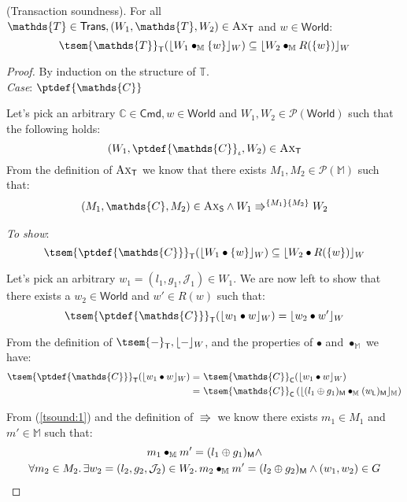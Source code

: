 \begin{thm}
	\label{thm:soundTrans}
	(Transaction soundness).
	For all $\mathds{T} \in \mathsf{Trans}, (W_1, \mathds{T}, W_2) \in \textsc{Ax}_\mathsf{T}$ and $w \in \mathsf{World}$:
	\[
		\tsem{\mathds{T}}_\mathsf{T}(\lfloor W_1 \bullet_\mathbb{M} \{ w \} \rfloor_W) \subseteq \lfloor W_2 \bullet_\mathbb{M} R(\{ w \}) \rfloor_W
	\]
	
	{\parindent0pt
	\begin{proof}
	By induction on the structure of $\mathds{T}$. \\	
	
	\textit{Case}: $\ptdef{\mathds{C}}$
	
	Let's pick an arbitrary $\mathds{C} \in \mathsf{Cmd}, w \in \mathsf{World}$ and $W_1, W_2 \in \mathcal{P}(\mathsf{World})$ such that the following holds:
	\[
		(W_1, \ptdef{\mathds{C}}_\iota, W_2) \in \textsc{Ax}_\mathsf{T}
	\]
	From the definition of $\textsc{Ax}_\mathsf{T}$ we know that there exists $M_1, M_2 \in \mathcal{P}(\mathbb{M})$ such that:
	\begin{gather}\label{tsound:1}
		(M_1, \mathds{C}, M_2) \in \textsc{Ax}_\mathsf{S} \land W_1 \Rrightarrow^{\{M_1\}\{M_2\}} W_2
	\end{gather}
	
	\textit{To show}:
	\[
		\tsem{\ptdef{\mathds{C}}}_\mathsf{T}(\lfloor W_1 \bullet \{w\} \rfloor_W) \subseteq \lfloor W_2 \bullet R(\{w\}) \rfloor_W
	\]
	
	Let's pick an arbitrary $w_1 = (l_1, g_1, \mathcal{J}_1) \in W_1$. We are now left to show that there exists a $w_2 \in \mathsf{World}$ and $w' \in R(w)$ such that:
	\[
		\tsem{\ptdef{\mathds{C}}}_\mathsf{T}(\lfloor w_1 \bullet w \rfloor_W) = \lfloor w_2 \bullet w' \rfloor_W
	\]
	
	From the definition of $\tsem{-}_\mathsf{T}, \lfloor - \rfloor_W$, and the properties of $\bullet$ and $\bullet_\mathbb{M}$ we have:
	\begin{align}
		\tsem{\ptdef{\mathds{C}}}_\mathsf{T}(\lfloor w_1 \bullet w \rfloor_W) =\
			&\tsem{\mathds{C}}_\mathsf{C}(\lfloor w_1 \bullet w \rfloor_W) \\
			\label{tsound:2} =\ &\tsem{\mathds{C}}_\mathsf{C}\left( \lfloor (l_1 \oplus g_1)_\mathsf{M} \bullet_\mathbb{M} (w_\mathsf{L})_\mathsf{M} \rfloor_\mathbb{M} \right)
	\end{align}
	
	From (\ref{tsound:1}) and the definition of $\Rrightarrow$ we know there exists $m_1 \in M_1$ and $m' \in \mathbb{M}$ such that:
	\begin{gather}
	\label{tsound:3} m_1 \bullet_\mathbb{M} m' = (l_1 \oplus g_1)_\mathsf{M} \land \\
	\label{tsound:4} \forall m_2 \in M_2 \ldotp \exists w_2 = (l_2, g_2, \mathcal{J}_2) \in W_2 \ldotp m_2 \bullet_\mathbb{M} m' = (l_2 \oplus g_2)_\mathsf{M} \land (w_1, w_2) \in G
	\end{gather}
	

\end{proof}}
\end{thm}
